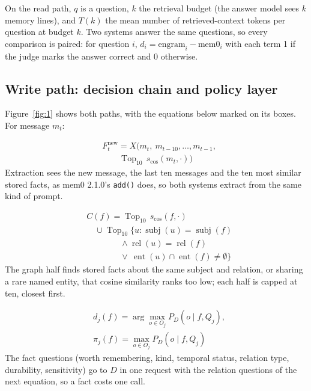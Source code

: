 \documentclass[11pt]{article}
\begin{document}
On the read path, $q$ is a question, $k$ the retrieval budget (the answer model sees $k$ memory lines), and $T(k)$ the mean number of retrieved-context tokens per question at budget $k$. Two systems answer the same questions, so every comparison is paired: for question $i$, $d_i = \text{engram}_i - \text{mem0}_i$ with each term 1 if the judge marks the answer correct and 0 otherwise.

\subsection{Write path: decision chain and policy layer}\label{sec:3.2}
Figure~\ref{fig:1} shows both paths, with the equations below marked on its boxes. For message $m_t$:

\begin{align}
& F^{\text{new}}_t = X\bigl(m_t,\ m_{t-10}, \ldots, m_{t-1}, \nonumber\\
& \qquad \operatorname{Top}_{10}\, s_{\cos}(m_t, \cdot)\bigr) \label{eq:extract}
\end{align}
Extraction sees the new message, the last ten messages and the ten most similar stored facts, as mem0 2.1.0's \texttt{add()} does, so both systems extract from the same kind of prompt.

\begin{align}
& C(f) = \operatorname{Top}_{10}\, s_{\cos}(f, \cdot) \nonumber\\
& \quad \cup \operatorname{Top}_{10}\bigl\{u : \operatorname{subj}(u) = \operatorname{subj}(f) \nonumber\\
& \qquad\qquad \wedge \operatorname{rel}(u) = \operatorname{rel}(f) \nonumber\\
& \qquad\qquad \vee\ \operatorname{ent}(u) \cap \operatorname{ent}(f) \neq \emptyset\bigr\} \label{eq:cand}
\end{align}
The graph half finds stored facts about the same subject and relation, or sharing a rare named entity, that cosine similarity ranks too low; each half is capped at ten, closest first.

\begin{align}
& d_j(f) = \arg\max_{o \in O_j} P_D(o \mid f, Q_j), \nonumber\\
& \pi_j(f) = \max_{o \in O_j} P_D(o \mid f, Q_j) \label{eq:factq}
\end{align}
The fact questions (worth remembering, kind, temporal status, relation type, durability, sensitivity) go to $D$ in one request with the relation questions of the next equation, so a fact costs one call.
\end{document}
